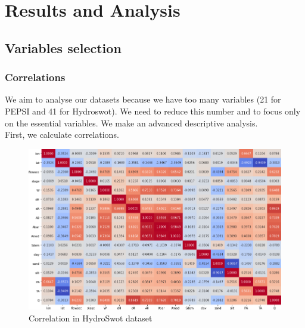 \section{Results and Analysis}
\subsection{Variables selection}
\subsubsection{Correlations}
We aim to analyse our datasets because we have too many variables (21 for PEPSI and 41 for Hydroswot). We need to reduce this number and to focus only on the essential variables. We make an advanced descriptive analysis.\\

First, we calculate correlations. 
\begin{figure}[H]
\centering
\includegraphics[scale=0.4]{Graph/correlation_hydro.png}
\caption{Correlation in HydroSwot dataset}
\label{corH}
\end{figure}

